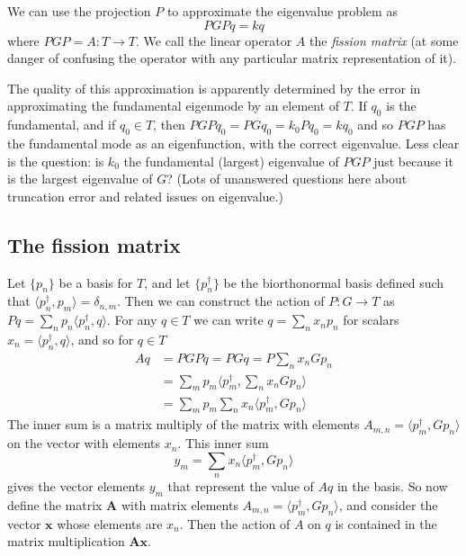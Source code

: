 \documentclass[11pt,onecolumn]{article}
\newcommand{\fm}{A}
\newcommand{\FM}{\mathbf{A}}
\newcommand{\x}{\mathbf{x}}
\begin{document}
We can use the projection $P$ to approximate the eigenvalue problem as
\begin{equation}
PGP q = k q
\end{equation}
where $PGP = \fm : T \to T$.  We call the linear operator $A$ the \emph{fission matrix} (at some danger of confusing the operator with any particular matrix representation of it).

The quality of this approximation is apparently determined by the error in approximating the fundamental eigenmode by an element of $T$.  If $q_0$ is the fundamental, and if $q_0 \in T$, then $PGP q_0 = PGq_0 = k_0 P q_0 = k q_0$ and so $PGP$ has the fundamental mode as an eigenfunction, with the correct eigenvalue.  Less clear is the question: is $k_0$ the fundamental (largest) eigenvalue of $PGP$ just because it is the largest eigenvalue of $G$?  (Lots of unanswered questions here about truncation error and related issues on eigenvalue.)

\subsection{The fission matrix}

Let $\{p_n\}$ be a basis for $T$, and let $\{p^\dagger_n\}$ be the biorthonormal basis defined such that $\langle p^\dagger_n, p_m\rangle = \delta_{n,m}$.  Then we can construct the action of $P: G \to T$ as $Pq = \sum_n p_n \langle p_n^\dagger, q \rangle$.  For any $q \in T$ we can write $q = \sum_n x_n p_n$ for scalars $x_n= \langle p_n^\dagger, q\rangle$, and so for $q \in T$
\begin{align}
\fm q &= PGP q = P G q = P \sum_n x_n G p_n \\
&= \sum_m p_m \bigl\langle p_m^\dagger, \sum_n x_n G p_n \bigr\rangle \\
&= \sum_m p_m \sum_n x_n \langle p_m^\dagger, G p_n \rangle
\end{align} 
The inner sum is a matrix multiply of the matrix with elements $A_{m,n} = \langle p_m^\dagger, G p_n \rangle$ on the vector with elements $x_n$.  This inner sum
\begin{equation}
y_m = \sum_n x_n \langle p_m^\dagger, G p_n \rangle
\end{equation}
gives the vector elements $y_m$ that represent the value of $A q$ in the basis.
So now define the matrix $\FM$ with matrix elements $A_{m,n} = \langle p_m^\dagger, G p_n \rangle$, and consider the vector $\x$ whose elements are $x_n$.  Then the action of $\fm$ on $q$ is contained in the matrix multiplication $\FM  \x$.
\end{document}
